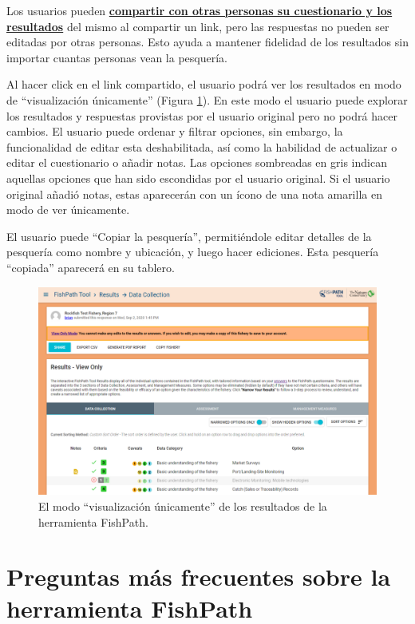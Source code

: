 \documentclass[
  11pt,
]{book}
\begin{document}
Los usuarios pueden \protect\hyperlink{Results-Actions}{\textbf{compartir con otras personas su cuestionario y los resultados}} del mismo al compartir un link, pero las respuestas no pueden ser editadas por otras personas. Esto ayuda a mantener fidelidad de los resultados sin importar cuantas personas vean la pesquería.

Al hacer click en el link compartido, el usuario podrá ver los resultados en modo de ``visualización únicamente'' (Figura \ref{fig:view-only}). En este modo el usuario puede explorar los resultados y respuestas provistas por el usuario original pero no podrá hacer cambios. El usuario puede ordenar y filtrar opciones, sin embargo, la funcionalidad de editar esta deshabilitada, así como la habilidad de actualizar o editar el cuestionario o añadir notas. Las opciones sombreadas en gris indican aquellas opciones que han sido escondidas por el usuario original. Si el usuario original añadió notas, estas aparecerán con un ícono de una nota amarilla en modo de ver únicamente.

El usuario puede ``Copiar la pesquería'', permitiéndole editar detalles de la pesquería como nombre y ubicación, y luego hacer ediciones. Esta pesquería ``copiada'' aparecerá en su tablero.

\begin{figure}

{\centering \includegraphics[width=0.95\linewidth]{images/view-only} 

}

\caption{El modo “visualización únicamente” de los resultados de la herramienta FishPath.}\label{fig:view-only}
\end{figure}

\hypertarget{appendix-appendix}{%
\appendix}


\hypertarget{preguntas-muxe1s-frecuentes-sobre-la-herramienta-fishpath}{%
\chapter{Preguntas más frecuentes sobre la herramienta FishPath}\label{preguntas-muxe1s-frecuentes-sobre-la-herramienta-fishpath}}
\end{document}

